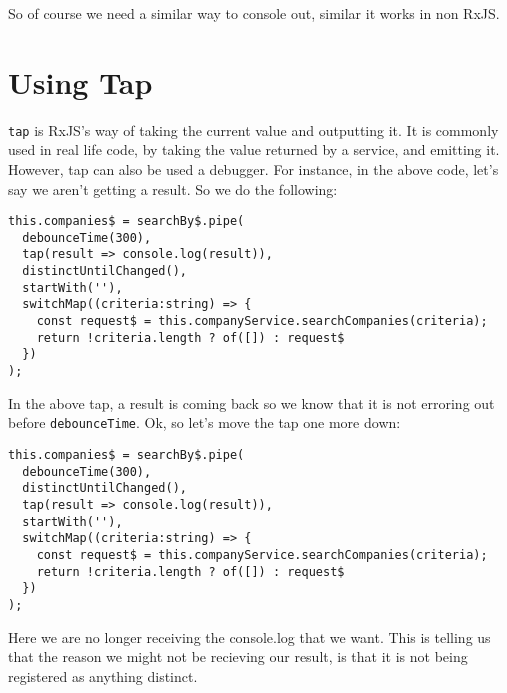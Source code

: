 So of course we need a similar way to console out, similar it works in non RxJS. 

\section{Using Tap}
\lstinline{tap} is RxJS's way of taking the current value and outputting it. It is commonly used in real life code, by taking the value returned by a service, and emitting it. However, tap can also be used a debugger. For instance, in the above code, let's say we aren't getting a result. So we do the following: 
\begin{lstlisting}
this.companies$ = searchBy$.pipe(
  debounceTime(300),
  tap(result => console.log(result)),
  distinctUntilChanged(),
  startWith(''),
  switchMap((criteria:string) => {
    const request$ = this.companyService.searchCompanies(criteria);
    return !criteria.length ? of([]) : request$
  })
);  
\end{lstlisting}

In the above tap, a result is coming back so we know that it is not erroring out before \lstinline{debounceTime}. Ok, so let's move the tap one more down: 
\begin{lstlisting}
this.companies$ = searchBy$.pipe(
  debounceTime(300),
  distinctUntilChanged(),
  tap(result => console.log(result)),
  startWith(''),
  switchMap((criteria:string) => {
    const request$ = this.companyService.searchCompanies(criteria);
    return !criteria.length ? of([]) : request$
  })
);  
\end{lstlisting}

Here we are no longer receiving the console.log that we want. This is telling us that the reason we might not be recieving our result, is that it is not being registered as anything distinct.

